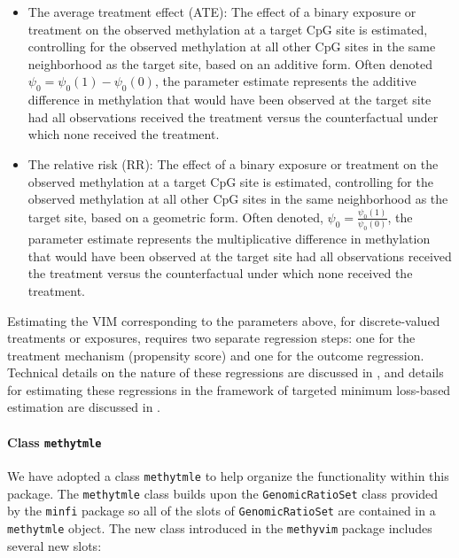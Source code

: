 \documentclass[9pt,a4paper,]{extarticle}
\theoremstyle{definition}
\theoremstyle{definition}
\theoremstyle{definition}
\theoremstyle{remark}
\begin{document}
\begin{itemize}
\item
  The average treatment effect (ATE): The effect of a binary exposure or
  treatment on the observed methylation at a target CpG site is estimated,
  controlling for the observed methylation at all other CpG sites in the same
  neighborhood as the target site, based on an additive form. Often denoted
  \(\psi_0 = \psi_0(1) - \psi_0(0)\), the parameter estimate represents the
  additive difference in methylation that would have been observed at the
  target site had all observations received the treatment versus the
  counterfactual under which none received the treatment.
\item
  The relative risk (RR): The effect of a binary exposure or treatment on the
  observed methylation at a target CpG site is estimated, controlling for the
  observed methylation at all other CpG sites in the same neighborhood as the
  target site, based on a geometric form. Often denoted,
  \(\psi_0 = \frac{\psi_0(1)}{\psi_0(0)}\), the parameter estimate represents the
  multiplicative difference in methylation that would have
  been observed at the target site had all observations received the treatment
  versus the counterfactual under which none received the treatment.
\end{itemize}

Estimating the VIM corresponding to the parameters above, for discrete-valued
treatments or exposures, requires two separate regression steps: one for the
treatment mechanism (propensity score) and one for the outcome regression.
Technical details on the nature of these regressions are discussed in
\citet{hernan2018causal}, and details for estimating these regressions in the
framework of targeted minimum loss-based estimation are discussed in
\citet{vdl2011targeted}.

\hypertarget{class-methytmle}{%
\paragraph{\texorpdfstring{Class \texttt{methytmle}}{Class methytmle}}\label{class-methytmle}}

We have adopted a class \texttt{methytmle} to help organize the functionality within
this package. The \texttt{methytmle} class builds upon the \texttt{GenomicRatioSet} class
provided by the \texttt{minfi} package so all of the slots of \texttt{GenomicRatioSet} are
contained in a \texttt{methytmle} object. The new class introduced in the \texttt{methyvim}
package includes several new slots:
\end{document}
